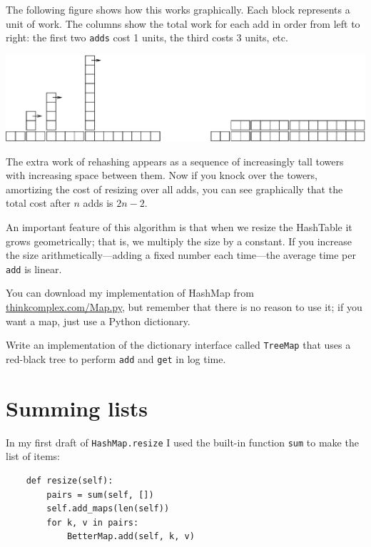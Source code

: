 \documentclass[10pt]{book}
\begin{document}
The following figure shows how this works graphically.  Each
block represents a unit of work.  The columns show the total
work for each add in order from left to right: the first two
{\tt adds} cost 1 units, the third costs 3 units, etc.

\beforefig
\centerline{\includegraphics[width=5.5in]{figs/towers.eps}}
\afterfig

The extra work of rehashing appears as a sequence of increasingly
tall towers with increasing space between them.  Now if you knock
over the towers, amortizing the cost of resizing over all
adds, you can see graphically that the total cost after $n$
adds is $2n - 2$.

An important feature of this algorithm is that when we resize the
HashTable it grows geometrically; that is, we multiply the size by a
constant.  If you increase the size
arithmetically---adding a fixed number each time---the average time
per {\tt add} is linear.

You can download my implementation of HashMap from
\url{thinkcomplex.com/Map.py}, but remember that there 
is no reason to use it; if you want a map, just use a Python dictionary.

\begin{ex}

Write an implementation of the dictionary interface called
{\tt TreeMap} that uses a red-black tree to perform {\tt add}
and {\tt get} in log time.

\end{ex}



\section{Summing lists}


In my first draft of {\tt HashMap.resize} I used the built-in function
{\tt sum} to make the list of items:

\begin{verbatim}
    def resize(self):
        pairs = sum(self, [])
        self.add_maps(len(self))
        for k, v in pairs:
            BetterMap.add(self, k, v)
\end{verbatim}
\end{document}
